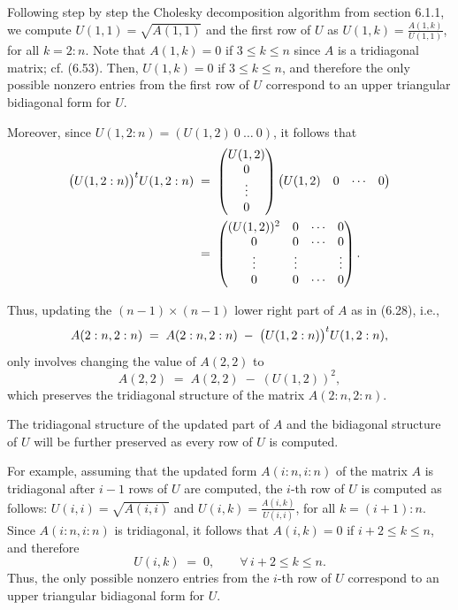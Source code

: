 Following step by step the Cholesky decomposition algorithm from section 6.1.1, we
compute $U(1,1) = \sqrt{A(1,1)}$ and the first row of $U$ as $U(1,k) =
\frac{A(1,k)}{U(1,1)}$, for all $k = 2:n$. Note that $A(1,k) = 0$ if $3 \le k \le n$
since $A$ is a tridiagonal matrix; cf. (6.53). Then, $U(1,k) = 0$ if $3 \le k \le n$,
and therefore the only possible nonzero entries from the first row of $U$ correspond to
an upper triangular bidiagonal form for $U$.

Moreover, since $U(1,2:n) = (U(1,2)\ 0\ \ldots\ 0)$, it follows that
\[
\begin{aligned}
\big(U(1,2:n)\big)^{t} U(1,2:n)
&\;=\;
\begin{pmatrix} U(1,2) \\ 0 \\ \vdots \\ 0 \end{pmatrix}
\begin{pmatrix} U(1,2) & 0 & \cdots & 0 \end{pmatrix} \\
&\;=\;
\begin{pmatrix}
(U(1,2))^2 & 0 & \cdots & 0 \\
0 & 0 & \cdots & 0 \\
\vdots & \vdots & & \vdots \\
0 & 0 & \cdots & 0
\end{pmatrix}.
\end{aligned}
\]

Thus, updating the $(n-1) \times (n-1)$ lower right part of $A$ as in (6.28), i.e.,
\[
A(2:n,2:n) \;=\; A(2:n,2:n) \;-\; \big(U(1,2:n)\big)^{t} U(1,2:n),
\]
only involves changing the value of $A(2,2)$ to
\[
A(2,2) \;=\; A(2,2) \;-\; (U(1,2))^2,
\]
which preserves the tridiagonal structure of the matrix $A(2:n,2:n)$.

The tridiagonal structure of the updated part of $A$ and the bidiagonal structure of
$U$ will be further preserved as every row of $U$ is computed.

For example, assuming that the updated form $A(i:n,i:n)$ of the matrix $A$ is
tridiagonal after $i-1$ rows of $U$ are computed, the $i$-th row of $U$ is computed as
follows: $U(i,i) = \sqrt{A(i,i)}$ and $U(i,k) = \frac{A(i,k)}{U(i,i)}$, for all $k =
(i+1):n$. Since $A(i:n,i:n)$ is tridiagonal, it follows that $A(i,k) = 0$ if $i+2 \le k
\le n$, and therefore
\[
U(i,k) \;=\; 0, \qquad \forall\, i+2 \le k \le n.
\]
Thus, the only possible nonzero entries from the $i$-th row of $U$ correspond to an
upper triangular bidiagonal form for $U$.

